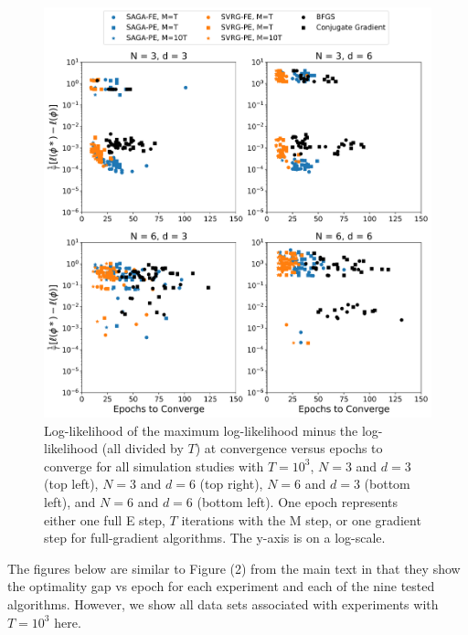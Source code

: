 \documentclass[12pt]{article}
\begin{document}
\begin{figure}[H]
    \centering
    \includegraphics[width=6.5in]{../plt/scatter_sim_T_1000.png}
    \caption{Log-likelihood of the maximum log-likelihood minus the log-likelihood (all divided by $T$) at convergence versus epochs to converge for all simulation studies with $T=10^{3}$, $N=3$ and $d=3$ (top left), $N=3$ and $d=6$ (top right), $N=6$ and $d=3$ (bottom left), and $N=6$ and $d=6$ (bottom left). One epoch represents either one full E step, $T$ iterations with the M step, or one gradient step for full-gradient algorithms. The y-axis is on a log-scale.}
    \label{fig:scatter_sim}
\end{figure}


\newpage 

The figures below are similar to Figure (2) from the main text in that they show the optimality gap vs epoch for each experiment and each of the nine tested algorithms. However, we show all data sets associated with experiments with $T = 10^3$ here.
\end{document}
